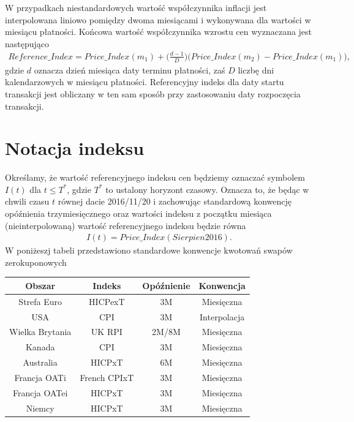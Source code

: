 \documentclass{mini}
\theoremstyle{mythstyle}
\begin{document}
	W przypadkach niestandardowych wartość współczynnika inflacji jest interpolowana liniowo pomiędzy dwoma miesiącami i wykonywana dla wartości w miesiącu płatności. Końcowa wartość współczynnika wzrostu cen wyznaczana jest następująco
	\begin{eqnarray*}
		Reference\_Index = Price\_Index(m_1) + \bigg(\frac{d - 1}{D}\bigg) \bigg(Price\_Index(m_2) - Price\_Index(m_1)\bigg),
	\end{eqnarray*}
	gdzie $d$ oznacza dzień miesiąca daty terminu płatności, zaś $D$  liczbę dni kalendarzowych w miesiącu płatności. Referencyjny indeks dla daty startu transakcji jest obliczany w ten sam sposób przy zastosowaniu daty rozpoczęcia transakcji.
	
	\section{Notacja indeksu}
	
	Określamy, że wartość referencyjnego indeksu cen będziemy oznaczać symbolem $I(t)$ dla $t \le T^*$, gdzie $T^*$ to ustalony horyzont czasowy. Oznacza to, że będąc w chwili czasu $t$ równej dacie 2016/11/20 i zachowując standardową konwencję opóźnienia trzymiesięcznego oraz wartości indeksu z początku miesiąca (nieinterpolowaną) wartość referencyjnego indeksu będzie równa
	\begin{eqnarray*}
		I(t) = Price\_Index(Sierpien2016).
	\end{eqnarray*}
	W poniżeszj tabeli przedstawiono standardowe konwencje kwotowań swapów zerokuponowych
	\begin{center}
		\begin{tabular}{c c c c}
			\textbf{Obszar} & \textbf{Indeks}  & \textbf{Opóźnienie} & \textbf{Konwencja}\\ \hline
			Strefa Euro & HICPexT & 3M & Miesięczna \\
			USA & CPI & 3M & Interpolacja \\
			Wielka Brytania & UK RPI & 2M/8M & Miesięczna \\
			Kanada & CPI & 3M & Miesięczna \\
			Australia & HICPxT & 6M & Miesięczna \\
			Francja OATi & French CPIxT & 3M & Miesięczna \\
			Francja OATei& HICPxT & 3M & Miesięczna \\
			Niemcy & HICPxT & 3M & Miesięczna
		\end{tabular}
	\end{center}
	
\end{document}
